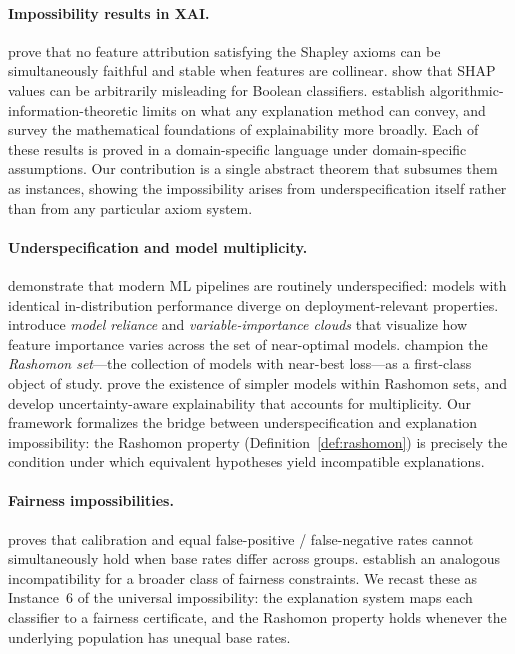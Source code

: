 
\paragraph{Impossibility results in XAI.}
\citet{bilodeau2024impossibility} prove that no feature attribution satisfying
the Shapley axioms can be simultaneously faithful and stable when features are
collinear.  \citet{huang2024failings} show that SHAP values can be arbitrarily
misleading for Boolean classifiers.  \citet{rao2025limits} establish
algorithmic-information-theoretic limits on what any explanation method can
convey, and \citet{noguer2025mathematical} survey the mathematical foundations
of explainability more broadly.  Each of these results is proved in a
domain-specific language under domain-specific assumptions.  Our contribution
is a single abstract theorem that subsumes them as instances, showing the
impossibility arises from underspecification itself rather than from any
particular axiom system.

\paragraph{Underspecification and model multiplicity.}
\citet{damour2022underspecification} demonstrate that modern ML pipelines are
routinely underspecified: models with identical in-distribution performance
diverge on deployment-relevant properties.
\citet{fisher2019models} introduce \emph{model reliance} and
\emph{variable-importance clouds} that visualize how feature importance varies
across the set of near-optimal models.
\citet{rudin2024amazing} champion the \emph{Rashomon set}---the collection of
models with near-best loss---as a first-class object of study.
\citet{semenova2022existence} prove the existence of simpler models within
Rashomon sets, and \citet{marx2024uncertainty} develop uncertainty-aware
explainability that accounts for multiplicity.  Our framework formalizes the
bridge between underspecification and explanation impossibility: the Rashomon
property (Definition~\ref{def:rashomon}) is precisely the condition under which
equivalent hypotheses yield incompatible explanations.

\paragraph{Fairness impossibilities.}
\citet{chouldechova2017fair} proves that calibration and equal false-positive /
false-negative rates cannot simultaneously hold when base rates differ across
groups.  \citet{kleinberg2017inherent} establish an analogous incompatibility
for a broader class of fairness constraints.  We recast these as Instance~6 of
the universal impossibility: the explanation system maps each classifier to a
fairness certificate, and the Rashomon property holds whenever the underlying
population has unequal base rates.

